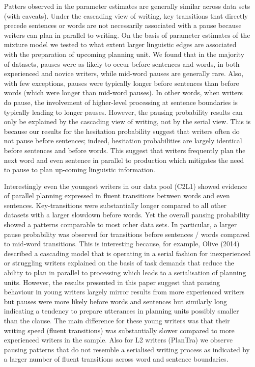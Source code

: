 \documentclass[
  man,floatsintext]{apa7}
\begin{document}
Patters observed in the parameter estimates are generally similar across data sets (with caveats). Under the cascading view of writing, key transitions that directly precede sentences or words are not necessarily associated with a pause because writers can plan in parallel to writing. On the basis of parameter estimates of the mixture model we tested to what extent larger linguistic edges are associated with the preparation of upcoming planning unit. We found that in the majority of datasets, pauses were as likely to occur before sentences and words, in both experienced and novice writers, while mid-word pauses are generally rare. Also, with few exceptions, pauses were typically longer before sentences than before words (which were longer than mid-word pauses). In other words, when writers do pause, the involvement of higher-level processing at sentence boundaries is typically leading to longer pauses. However, the pausing probability results can only be explained by the cascading view of writing, not by the serial view. This is because our results for the hesitation probability suggest that writers often do not pause before sentences; indeed, hesitation probabilities are largely identical before sentences and before words. This suggest that writers frequently plan the next word and even sentence in parallel to production which mitigates the need to pause to plan up-coming linguistic information.

Interestingly even the youngest writers in our data pool (C2L1) showed evidence of parallel planning expressed in fluent transitions between words and even sentences. Key-transitions were substantially longer compared to all other datasets with a larger slowdown before words. Yet the overall pausing probability showed a patterns comparable to most other data sets. In particular, a larger pause probability was observed for transitions before sentences / words compared to mid-word transitions. This is interesting because, for example, Olive (2014) described a cascading model that is operating in a serial fashion for inexperienced or struggling writers explained on the basis of task demands that reduce the ability to plan in parallel to processing which leads to a serialisation of planning units. However, the results presented in this paper suggest that pausing behaviour in young writers largely mirror results from more experienced writers but pauses were more likely before words and sentences but similarly long indicating a tendency to prepare utterances in planning units possibly smaller than the clause. The main difference for these young writers was that their writing speed (fluent transitions) was substantially slower compared to more experienced writers in the sample. Also for L2 writers (PlanTra) we observe pausing patterns that do not resemble a serialised writing process as indicated by a larger number of fluent transitions across word and sentence boundaries.
\end{document}
